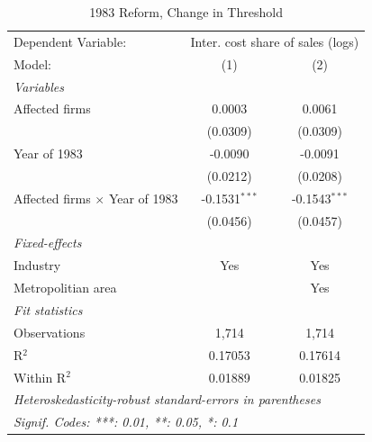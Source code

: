 \documentclass[
  12pt]{article}
\theoremstyle{definition}
\theoremstyle{remark}
\begin{document}
\hypertarget{tbl-did-change-threshold}{}
\begingroup
\centering
\begin{table}
\caption{\label{tbl-did-change-threshold}1983 Reform, Change in Threshold }\tabularnewline

\centering
\begin{tabular}{lcc}
   \tabularnewline \midrule \midrule
   Dependent Variable: & \multicolumn{2}{c}{Inter. cost share of sales (logs)}\\
   Model:                                & (1)             & (2)\\  
   \midrule
   \emph{Variables}\\
   Affected firms                        & 0.0003          & 0.0061\\   
                                         & (0.0309)        & (0.0309)\\   
   Year of 1983                          & -0.0090         & -0.0091\\   
                                         & (0.0212)        & (0.0208)\\   
   Affected firms $\times$ Year of 1983  & -0.1531$^{***}$ & -0.1543$^{***}$\\   
                                         & (0.0456)        & (0.0457)\\   
   \midrule
   \emph{Fixed-effects}\\
   Industry                              & Yes             & Yes\\  
   Metropolitian area                    &                 & Yes\\  
   \midrule
   \emph{Fit statistics}\\
   Observations                          & 1,714           & 1,714\\  
   R$^2$                                 & 0.17053         & 0.17614\\  
   Within R$^2$                          & 0.01889         & 0.01825\\  
   \midrule \midrule
   \multicolumn{3}{l}{\emph{Heteroskedasticity-robust standard-errors in parentheses}}\\
   \multicolumn{3}{l}{\emph{Signif. Codes: ***: 0.01, **: 0.05, *: 0.1}}\\
\end{tabular}
\end{table}

\par\endgroup
\end{document}
